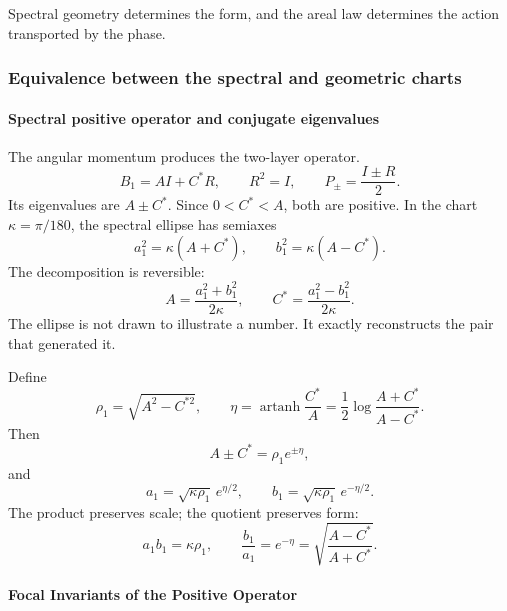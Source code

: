 \noindent Spectral geometry determines the form, and the areal law determines the action transported by the phase.\par\medskip

\subsubsection{Equivalence between the spectral and geometric charts}

\paragraph{Spectral positive operator and conjugate eigenvalues}

The angular momentum produces the two-layer operator.
\begin{equation}
B_1=AI+C^*R,\qquad R^2=I,\qquad
P_\pm=\frac{I\pm R}{2}.
\label{eq:B1}
\end{equation}
Its eigenvalues are \(A\pm C^*\). Since \(0<C^*<A\), both are positive.
In the chart \(\kappa=\pi/180\), the spectral ellipse has semiaxes
\begin{equation}
a_1^2=\kappa(A+C^*),\qquad
b_1^2=\kappa(A-C^*).
\label{eq:semiejes-espectrales}
\end{equation}
The decomposition is reversible:
\begin{equation}
A=\frac{a_1^2+b_1^2}{2\kappa},\qquad
C^*=\frac{a_1^2-b_1^2}{2\kappa}.
\label{eq:reconstruccion-AC}
\end{equation}
The ellipse is not drawn to illustrate a number. It exactly reconstructs the pair that generated it.

Define
\begin{equation}
\rho_1=\sqrt{A^2-C^{*2}},\qquad
\eta=\operatorname{artanh}\frac{C^*}{A}
=\frac12\log\frac{A+C^*}{A-C^*}.
\label{eq:eta}
\end{equation}
Then
\[
A\pm C^*=\rho_1e^{\pm\eta},
\]
and
\begin{equation}
a_1=\sqrt{\kappa\rho_1}\,e^{\eta/2},
\qquad
b_1=\sqrt{\kappa\rho_1}\,e^{-\eta/2}.
\label{eq:semiejes-eta}
\end{equation}
The product preserves scale; the quotient preserves form:
\[
a_1b_1=\kappa\rho_1,
\qquad
\frac{b_1}{a_1}=e^{-\eta}
=\sqrt{\frac{A-C^*}{A+C^*}}.
\]

\paragraph{Focal Invariants of the Positive Operator}

